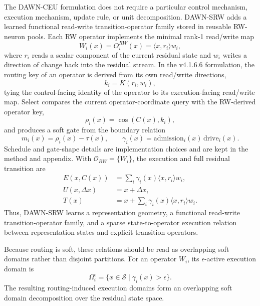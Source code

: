 \documentclass{article}
\begin{document}
The DAWN-CEU formulation does not require a particular control mechanism, execution mechanism, update rule, or unit decomposition. DAWN-SRW adds a learned functional read-write transition-operator family stored in reusable RW-neuron pools. Each RW operator implements the minimal rank-1 read/write map
\begin{equation}
    W_i(x)=O_i^{RW}(x)=\langle x,r_i\rangle w_i,
\end{equation}
where $r_i$ reads a scalar component of the current residual state and $w_i$ writes a direction of change back into the residual stream. In the v4.1.6.6 formulation, the routing key of an operator is derived from its own read/write directions,
\begin{equation}
    k_i=K(r_i,w_i),
    \label{eq:intro_rw_derived_key}
\end{equation}
tying the control-facing identity of the operator to its execution-facing read/write map. Select compares the current operator-coordinate query with the RW-derived operator key,
\begin{equation}
    \rho_i(x)=\cos(C(x),k_i),
    \label{eq:intro_rw_operator_score}
\end{equation}
and produces a soft gate from the boundary relation
\begin{equation}
    m_i(x)=\rho_i(x)-\tau(x),\qquad
    \gamma_i(x)=\mathrm{admission}_i(x)\,\mathrm{drive}_i(x).
    \label{eq:intro_rw_gate}
\end{equation}
Schedule and gate-shape details are implementation choices and are kept in the method and appendix. With $\mathcal{O}_{RW}=\{W_i\}$, the execution and full residual transition are
\begin{align}
    E(x,C(x)) &= \sum_i \gamma_i(x)\langle x,r_i\rangle w_i, \\
    U(x,\Delta x) &= x+\Delta x, \\
    T(x) &= x+\sum_i \gamma_i(x)\langle x,r_i\rangle w_i .
    \label{eq:intro_operator_coordinate_srw_transition}
\end{align}
Thus, DAWN-SRW learns a representation geometry, a functional read-write transition-operator family, and a sparse state-to-operator execution relation between representation states and explicit transition operators.

Because routing is soft, these relations should be read as overlapping soft domains rather than disjoint partitions. For an operator $W_i$, its $\epsilon$-active execution domain is
\begin{equation}
    \Omega_i^\epsilon=\{x\in\mathcal{S}\mid \gamma_i(x)>\epsilon\}.
    \label{eq:intro_execution_domain}
\end{equation}
The resulting routing-induced execution domains form an overlapping soft domain decomposition over the residual state space.
\end{document}
